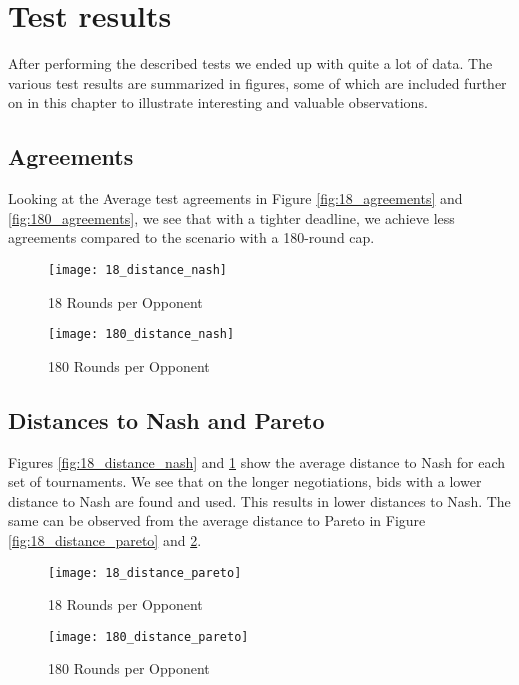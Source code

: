 \section{Test results}

After performing the described tests we ended up with quite a lot of data. The various test results are summarized in figures, some of which are included further on in this chapter to illustrate interesting and valuable observations.

\subsection{Agreements}

Looking at the Average test agreements in Figure \ref{fig:18_agreements} and \ref{fig:180_agreements}, we see that with a tighter deadline, we achieve less agreements compared to the scenario with a 180-round cap.

\begin{figure}[!htb]
	\texttt{[image: 18\_distance\_nash]}
	\caption{18 Rounds per Opponent}
	\label{fig:18_distance_nash}
	\endminipage\hfill
	\texttt{[image: 180\_distance\_nash]}
	\caption{180 Rounds per Opponent}
	\label{fig:180_distance_nash}
	\endminipage\hfill
\end{figure}

\subsection{Distances to Nash and Pareto}

Figures \ref{fig:18_distance_nash} and \ref{fig:180_distance_nash} show the average distance to Nash for each set of tournaments. We see that on the longer negotiations, bids with a lower distance to Nash are found and used. This results in lower distances to Nash. The same can be observed from the average distance to Pareto in Figure \ref{fig:18_distance_pareto} and \ref{fig:180_distance_pareto}.

\begin{figure}[!htb]
	\texttt{[image: 18\_distance\_pareto]}
	\caption{18 Rounds per Opponent}
	\label{fig:18_distance_pareto}
	\endminipage\hfill
	\texttt{[image: 180\_distance\_pareto]}
	\caption{180 Rounds per Opponent}
	\label{fig:180_distance_pareto}
	\endminipage\hfill
\end{figure}

